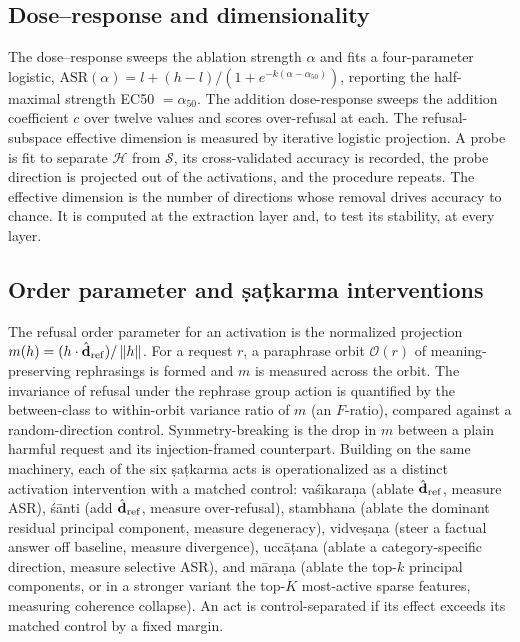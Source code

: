 \subsection{Dose--response and dimensionality}
The dose--response sweeps the ablation strength $\alpha$ and fits a four-parameter
logistic, $\mathrm{ASR}(\alpha)=l+(h-l)/(1+e^{-k(\alpha-\alpha_{50})})$, reporting the
half-maximal strength EC50 $=\alpha_{50}$. The addition dose-response sweeps the
addition coefficient $c$ over twelve values and scores over-refusal at each. The
refusal-subspace effective dimension is measured by iterative logistic projection. A
probe is fit to separate $\mathcal{H}$ from $\mathcal{S}$, its cross-validated accuracy
is recorded, the probe direction is projected out of the activations, and the procedure
repeats. The effective dimension is the number of directions whose removal drives
accuracy to chance. It is computed at the extraction layer and, to test its stability,
at every layer.

\subsection{Order parameter and \d{s}a\d{t}karma interventions}
The refusal order parameter for an activation is the normalized projection
$m(h) = (h\cdot\hat{\mathbf{d}}_{\mathrm{ref}})/\left\|h\right\|$. For a request $r$, a paraphrase orbit
$\mathcal{O}(r)$ of meaning-preserving rephrasings is formed and $m$ is measured across
the orbit. The invariance of refusal under the rephrase group action is quantified by
the between-class to within-orbit variance ratio of $m$ (an $F$-ratio), compared
against a random-direction control. Symmetry-breaking is the drop in $m$ between a
plain harmful request and its injection-framed counterpart. Building on the same
machinery, each of the six \d{s}a\d{t}karma acts is operationalized as a distinct
activation intervention with a matched control: vaś\=\i kara\d{n}a (ablate $\hat{\mathbf{d}}_{\mathrm{ref}}$,
measure ASR), ś\=anti (add $\hat{\mathbf{d}}_{\mathrm{ref}}$, measure over-refusal), stambhana (ablate the
dominant residual principal component, measure degeneracy), vidve\d{s}a\d{n}a (steer a
factual answer off baseline, measure divergence), ucc\=a\d{t}ana (ablate a
category-specific direction, measure selective ASR), and m\=ara\d{n}a (ablate the
top-$k$ principal components, or in a stronger variant the top-$K$ most-active sparse
features, measuring coherence collapse). An act is control-separated if its effect
exceeds its matched control by a fixed margin.

